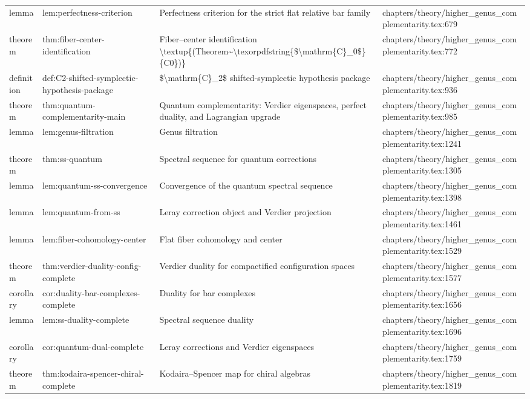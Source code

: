 \documentclass[11pt]{article}
\begin{document}
\begin{longtable}{L{0.10\textwidth}L{0.26\textwidth}L{0.42\textwidth}L{0.22\textwidth}}
lemma & lem:perfectness-criterion & Perfectness criterion for the strict flat relative bar family & chapters/theory/higher\_genus\_complementarity.tex:679\\
theorem & thm:fiber-center-identification & Fiber--center identification \textbackslash{}textup\{(Theorem\textasciitilde{}\textbackslash{}texorpdfstring\{\$\textbackslash{}mathrm\{C\}\_0\$\}\{C0\})\} & chapters/theory/higher\_genus\_complementarity.tex:772\\
definition & def:C2-shifted-symplectic-hypothesis-package & \$\textbackslash{}mathrm\{C\}\_2\$ shifted-symplectic hypothesis package & chapters/theory/higher\_genus\_complementarity.tex:936\\
theorem & thm:quantum-complementarity-main & Quantum complementarity: Verdier eigenspaces, perfect duality, and Lagrangian upgrade & chapters/theory/higher\_genus\_complementarity.tex:985\\
lemma & lem:genus-filtration & Genus filtration & chapters/theory/higher\_genus\_complementarity.tex:1241\\
theorem & thm:ss-quantum & Spectral sequence for quantum corrections & chapters/theory/higher\_genus\_complementarity.tex:1305\\
lemma & lem:quantum-ss-convergence & Convergence of the quantum spectral sequence & chapters/theory/higher\_genus\_complementarity.tex:1398\\
lemma & lem:quantum-from-ss & Leray correction object and Verdier projection & chapters/theory/higher\_genus\_complementarity.tex:1461\\
lemma & lem:fiber-cohomology-center & Flat fiber cohomology and center & chapters/theory/higher\_genus\_complementarity.tex:1529\\
theorem & thm:verdier-duality-config-complete & Verdier duality for compactified configuration spaces & chapters/theory/higher\_genus\_complementarity.tex:1577\\
corollary & cor:duality-bar-complexes-complete & Duality for bar complexes & chapters/theory/higher\_genus\_complementarity.tex:1656\\
lemma & lem:ss-duality-complete & Spectral sequence duality & chapters/theory/higher\_genus\_complementarity.tex:1696\\
corollary & cor:quantum-dual-complete & Leray corrections and Verdier eigenspaces & chapters/theory/higher\_genus\_complementarity.tex:1759\\
theorem & thm:kodaira-spencer-chiral-complete & Kodaira--Spencer map for chiral algebras & chapters/theory/higher\_genus\_complementarity.tex:1819\\

\end{longtable}
\end{document}
